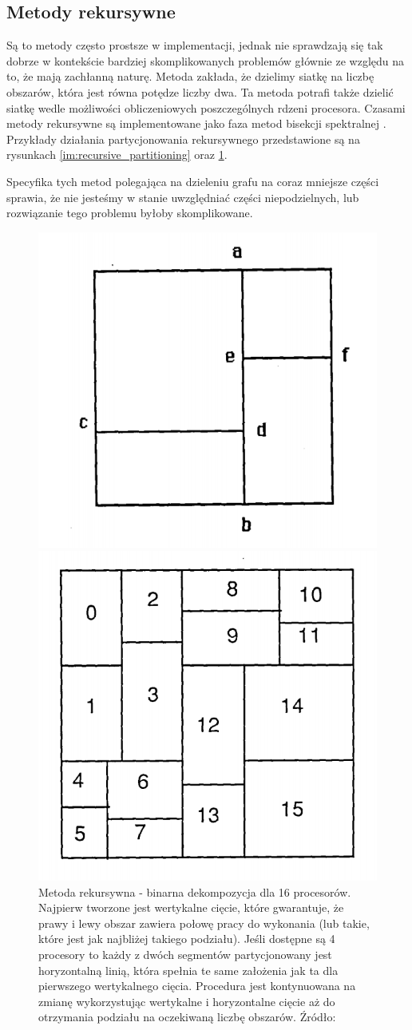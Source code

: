 \subsection{Metody rekursywne}

Są to metody często prostsze w implementacji, jednak nie sprawdzają się tak dobrze w kontekście bardziej
skomplikowanych problemów głównie ze względu na to, że mają zachłanną naturę.
Metoda \cite{recursive} zakłada, że dzielimy siatkę na liczbę obszarów,
która jest równa potędze liczby dwa. Ta metoda potrafi także dzielić siatkę wedle możliwości obliczeniowych
poszczególnych rdzeni procesora. Czasami metody rekursywne są implementowane jako faza metod
bisekcji spektralnej \cite{10.1137/0611030}. Przykłady działania partycjonowania rekursywnego przedstawione są na rysunkach
\ref{im:recursive_partitioning} oraz \ref{im:rec_partitioning}.

Specyfika tych metod polegająca na dzieleniu grafu na coraz mniejsze
części sprawia, że nie jesteśmy w stanie uwzględniać części niepodzielnych, lub rozwiązanie tego problemu byłoby skomplikowane.


\begin{figure}[h]
    \centering
    \includegraphics[width=0.3\linewidth]{images/recursive}
    \caption{Przedstawia partycjonowanie rekursywne na głębokości wynoszącej 2. Linia partycjonowania a-b, która została stworzona
    przez partycjonowanie poziomu 1 jest podzielona na 3 segmenty przez dwie linie partycjonowania poziomu drugiego:
    c-d, e-f. Źródło: \cite{recursive}}
    \label{im:recursive_partitioning}

    \includegraphics[width=0.3\linewidth]{images/recursive-part}
    \caption{Metoda rekursywna - binarna dekompozycja dla 16 procesorów. Najpierw tworzone jest wertykalne cięcie,
        które gwarantuje, że prawy i lewy obszar
        zawiera połowę pracy do wykonania (lub takie, które jest jak najbliżej takiego podziału). Jeśli dostępne
        są 4 procesory to każdy z dwóch segmentów partycjonowany jest horyzontalną linią, która spełnia te same założenia
        jak ta dla pierwszego wertykalnego cięcia. Procedura jest kontynuowana na zmianę wykorzystując wertykalne i
        horyzontalne cięcie aż do otrzymania podziału na oczekiwaną liczbę obszarów. Źródło: \cite{recursive}}
    \label{im:rec_partitioning}
\end{figure}

